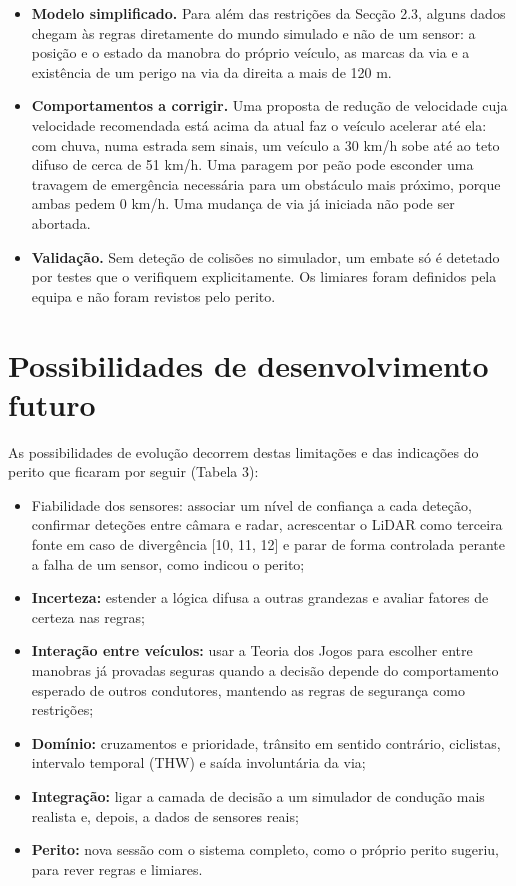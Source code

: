\begin{itemize}
  \item \textbf{Modelo simplificado.} Para além das restrições da Secção 2.3, alguns dados chegam às regras diretamente do mundo simulado e não de um sensor: a posição e o estado da manobra do próprio veículo, as marcas da via e a existência de um perigo na via da direita a mais de 120 m.
  \item \textbf{Comportamentos a corrigir.} Uma proposta de redução de velocidade cuja velocidade
        recomendada está acima da atual faz o veículo acelerar até ela: com chuva, numa estrada sem
        sinais, um veículo a 30 km/h sobe até ao teto difuso de cerca de 51 km/h. Uma paragem por
        peão pode esconder uma travagem de emergência necessária para um obstáculo mais próximo,
        porque ambas pedem 0 km/h. Uma mudança de via já iniciada não pode ser abortada.
  \item \textbf{Validação.} Sem deteção de colisões no simulador, um embate só é detetado por
        testes que o verifiquem explicitamente. Os limiares foram definidos pela equipa e não foram
        revistos pelo perito.
\end{itemize}

\section{Possibilidades de desenvolvimento futuro}\label{sec:futuro}

As possibilidades de evolução decorrem destas limitações e das indicações do perito que ficaram por seguir (Tabela 3):

\begin{itemize}
  \item Fiabilidade dos sensores: associar um nível de confiança a cada deteção, confirmar deteções entre câmara e radar, acrescentar o LiDAR como terceira fonte em caso de divergência [10, 11, 12] e parar de forma controlada perante a falha de um sensor, como indicou o perito;
  \item \textbf{Incerteza:} estender a lógica difusa a outras grandezas e avaliar fatores de certeza
        nas regras;
  \item \textbf{Interação entre veículos:} usar a Teoria dos Jogos para escolher entre manobras já
        provadas seguras quando a decisão depende do comportamento esperado de outros condutores,
        mantendo as regras de segurança como restrições;
  \item \textbf{Domínio:} cruzamentos e prioridade, trânsito em sentido contrário, ciclistas,
        intervalo temporal (THW) e saída involuntária da via;
  \item \textbf{Integração:} ligar a camada de decisão a um simulador de condução mais realista e,
        depois, a dados de sensores reais;
  \item \textbf{Perito:} nova sessão com o sistema completo, como o próprio perito sugeriu, para
        rever regras e limiares.
\end{itemize}
